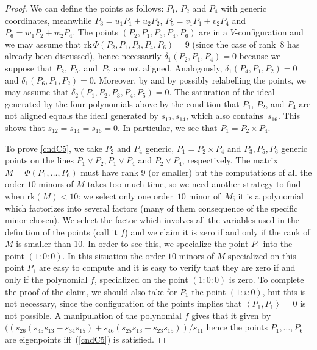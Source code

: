 \documentclass{amsart}
\theoremstyle{plain}
\theoremstyle{definition}
\newcommand{\scl}[2]{\left\langle {#1}, {#2} \right\rangle}
\newcommand{\rk}{\ensuremath{\mathrm{rk}}}
\begin{document}
\bigskip

\begin{proof}
We can define the points as follows: $P_1$, $P_2$ and $P_4$ with generic
coordinates, meanwhile $P_3 = u_1P_1+u_2P_2$, $P_5 = v_1P_1+v_2P_4$ and
$P_6 = w_1P_2+w_2P_4$. The points $(P_2, P_1, P_3, P_4, P_6)$ are in a
$V$-configuration and we may assume that $\rk \, \Phi(P_2, P_1, P_3, P_4, P_6) = 9$ (since the case of rank~$8$ has already been discussed), hence necessarily $\delta_1(P_2, P_1, P_4)=0$ because we suppose that $P_2$, $P_5$, and~$P_7$ are not aligned.
Analogously, $\delta_1(P_4, P_1, P_2) = 0$ and $\delta_1(P_6, P_1, P_2) = 0$. Moreover, by  and by possibly relabelling the points, we may assume that $\delta_2(P_1, P_2, P_3, P_4, P_5)=0$. The saturation of the ideal generated by the four polynomials
above by the condition that $P_1$, $P_2$, and $P_4$ are not aligned equals the ideal generated by
$s_{12}, s_{14}$, which also contains~$s_{16}$. This shows that
$s_{12} = s_{14}=s_{16}=0$. In particular, we see that $P_1 = P_2 \times P_4$. 

To prove \eqref{cndC5}, we take $P_2$ and $P_4$ generic,
$P_1 = P_2 \times P_4$ and $P_3, P_5, P_6$ generic points on the lines
$P_1 \vee P_2, P_1 \vee P_4$ and $P_2 \vee P_4$, respectively. The matrix
$M = \Phi(P_1, \dots, P_6)$ must have rank $9$ (or smaller) but the computations
of all the order $10$-minors of $M$ takes too much time, so we need another
strategy to find when $\rk (M) < 10$: we select
only one order~$10$ minor of~$M$; it is a polynomial which
factorizes into
several factors (many of them consequence of the specific minor chosen).
We select the factor which involves all the variables used in the definition
of the points (call it $f$) and we claim it is zero if and only if the
rank of $M$
is smaller than $10$. In order to see this, we specialize the point $P_1$
into the point $(1:0:0)$. In this situation the order $10$ minors of $M$
specialized on this point $P_1$ are easy to compute and it is easy to
verify that they are zero if and only if the polynomial $f$, specialized
on the point $(1:0:0)$ is zero. To complete the proof of the claim, we should
also take for $P_1$ the point $(1:i:0)$, but this is not necessary, since
the configuration of the points implies that $\scl{P_1}{P_1}=0$ is not
possible. A manipulation of the polynomial $f$ gives that it given by
$((s_{26}(s_{45}s_{13}-s_{34}s_{15})+s_{46}(s_{25}s_{13}-s_{23}s_{15}))/s_{11}$
hence the points $P_1, \dots, P_6$ are eigenpoints iff~(\ref{cndC5}) is
satisfied. 


\end{proof}
\end{document}
